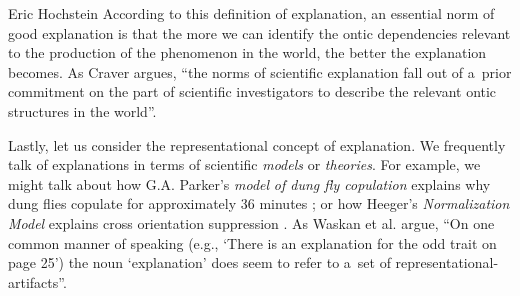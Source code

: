 \begin{artengenv}{Eric Hochstein}
According to this definition of explanation, an essential norm of good explanation is that the more we can identify the ontic dependencies relevant to the production of the phenomenon in the world, the better the explanation becomes. As Craver
\parencite*[][p.41]{kaiser_ontic_2014} %
 argues, ``the norms of scientific explanation fall out of a~prior commitment on the part of scientific investigators to describe the relevant ontic structures in the world''.

Lastly, let us consider the representational concept of explanation. We frequently talk of explanations in terms of scientific \textit{models} or \textit{theories}. For example, we might talk about how G.A. Parker's
\parencite*[][]{krebs_searching_1978} %
 \textit{model} \textit{of dung fly copulation} explains why dung flies copulate for approximately 36 minutes 
\parencite[see,][]{rice_moving_2015};
 or how Heeger's 
\parencite*[][]{heeger_normalization_1992} %
 \textit{Normalization Model} explains cross orientation suppression 
\parencite[see,][]{chirimuuta_minimal_2014}.
 As Waskan et al. 
\parencite*[][p.3090]{bello_three_2014} %
 argue, ``On one common manner of speaking (e.g., ‘There is an explanation for the odd trait on page 25') the noun ‘explanation' does seem to refer to a~set of representational-artifacts''.


\end{artengenv}
